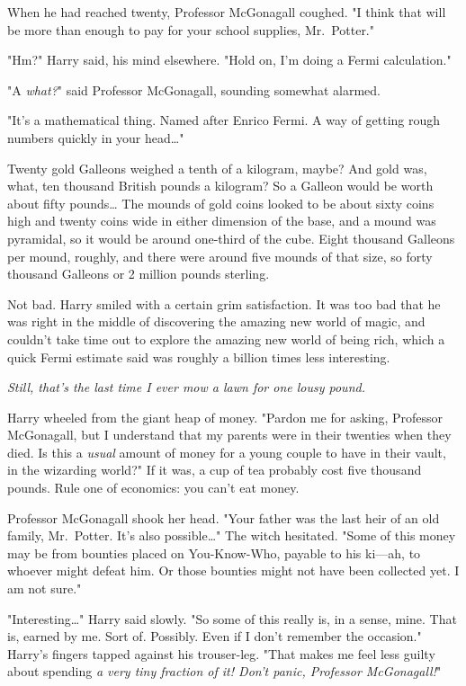 When he had reached twenty, Professor McGonagall coughed. "I think that will be more than enough to pay for your school supplies, Mr.~Potter."

"Hm?" Harry said, his mind elsewhere. "Hold on, I'm doing a Fermi calculation."

"A \emph{what?}" said Professor McGonagall, sounding somewhat alarmed.

"It's a mathematical thing. Named after Enrico Fermi. A way of getting rough numbers quickly in your head{\ldots}"

Twenty gold Galleons weighed a tenth of a kilogram, maybe? And gold was, what, ten thousand British pounds a kilogram? So a Galleon would be worth about fifty pounds{\ldots} The mounds of gold coins looked to be about sixty coins high and twenty coins wide in either dimension of the base, and a mound was pyramidal, so it would be around one-third of the cube. Eight thousand Galleons per mound, roughly, and there were around five mounds of that size, so forty thousand Galleons or 2 million pounds sterling.

Not bad. Harry smiled with a certain grim satisfaction. It was too bad that he was right in the middle of discovering the amazing new world of magic, and couldn't take time out to explore the amazing new world of being rich, which a quick Fermi estimate said was roughly a billion times less interesting.

\emph{Still, that's the last time I ever mow a lawn for one lousy pound.}

Harry wheeled from the giant heap of money. "Pardon me for asking, Professor McGonagall, but I understand that my parents were in their twenties when they died. Is this a \emph{usual} amount of money for a young couple to have in their vault, in the wizarding world?" If it was, a cup of tea probably cost five thousand pounds. Rule one of economics: you can't eat money.

Professor McGonagall shook her head. "Your father was the last heir of an old family, Mr.~Potter. It's also possible{\ldots}" The witch hesitated. "Some of this money may be from bounties placed on You-Know-Who, payable to his ki---ah, to whoever might defeat him. Or those bounties might not have been collected yet. I am not sure."

"Interesting{\ldots}" Harry said slowly. "So some of this really is, in a sense, mine. That is, earned by me. Sort of. Possibly. Even if I don't remember the occasion." Harry's fingers tapped against his trouser-leg. "That makes me feel less guilty about spending \emph{a very tiny fraction of it! Don't panic, Professor McGonagall!}"

